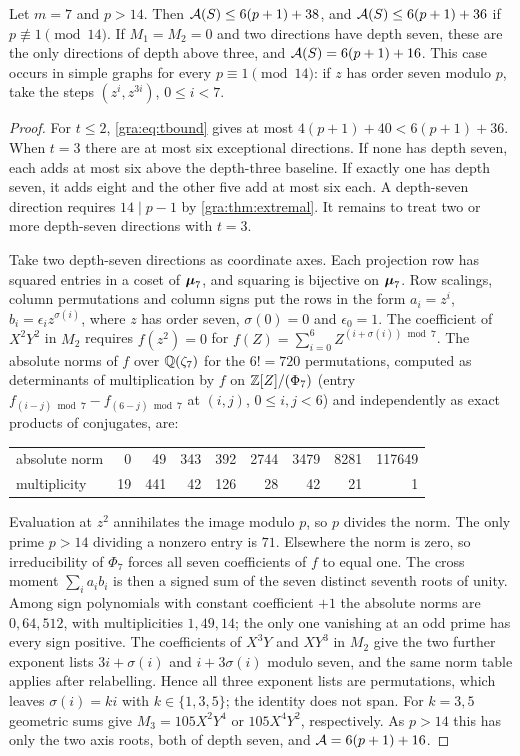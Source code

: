 \begin{theorem}\label{gra:thm:seven}
Let $m=7$ and $p>14$. Then $\mathcal{A}(S)\le6(p+1)+38$, and
$\mathcal{A}(S)\le6(p+1)+36$ if $p\not\equiv1\pmod{14}$. If $M_1=M_2=0$ and two
directions have depth seven, these are the only directions of depth above
three, and $\mathcal{A}(S)=6(p+1)+16$. This case occurs in simple graphs for
every $p\equiv1\pmod{14}$: if $z$ has order seven modulo $p$, take the
steps $(z^i,z^{3i})$, $0\le i<7$.
\end{theorem}

\begin{proof}
For $t\le2$, \eqref{gra:eq:tbound} gives at most
$4(p+1)+40<6(p+1)+36$. When $t=3$ there are at most six exceptional
directions. If none has depth seven, each adds at most six above the
depth-three baseline. If exactly one has depth seven, it adds eight and
the other five add at most six each. A depth-seven direction requires
$14\mid p-1$ by \cref{gra:thm:extremal}. It remains to treat two or more
depth-seven directions with $t=3$.

Take two depth-seven directions as coordinate axes. Each projection row
has squared entries in a coset of $\boldsymbol{\mu}_7$, and squaring is bijective on
$\boldsymbol{\mu}_7$. Row scalings, column permutations and column signs put the
rows in the form $a_i=z^i$, $b_i=\epsilon_iz^{\sigma(i)}$, where $z$ has
order seven, $\sigma(0)=0$ and $\epsilon_0=1$. The coefficient of
$X^2Y^2$ in $M_2$ requires $f(z^2)=0$ for
$f(Z)=\sum_{i=0}^6Z^{(i+\sigma(i))\bmod7}$. The absolute norms of $f$ over
$\mathbb{Q}(\zeta_7)$ for the $6!=720$ permutations, computed as determinants of
multiplication by $f$ on $\mathbb{Z}[Z]/(\Phi_7)$ (entry
$f_{(i-j)\bmod7}-f_{(6-j)\bmod7}$ at $(i,j)$, $0\le i,j<6$) and
independently as exact products of conjugates, are:
\begin{center}\small\upshape
\begin{tabular}{lrrrrrrrr}
\toprule
absolute norm & 0 & 49 & 343 & 392 & 2744 & 3479 & 8281 & 117649\\
multiplicity & 19 & 441 & 42 & 126 & 28 & 42 & 21 & 1\\
\bottomrule
\end{tabular}
\end{center}
Evaluation at $z^2$ annihilates the image modulo $p$, so $p$ divides the
norm. The only prime $p>14$ dividing a nonzero entry is $71$. Elsewhere
the norm is zero, so irreducibility of $\Phi_7$ forces all seven
coefficients of $f$ to equal one. The cross moment $\sum_ia_ib_i$ is then a
signed sum of the seven distinct seventh roots of unity. Among sign
polynomials with constant coefficient $+1$ the absolute norms are
$0,64,512$, with multiplicities $1,49,14$; the only one vanishing at an
odd prime has every sign positive. The coefficients of $X^3Y$ and $XY^3$
in $M_2$ give the two further exponent lists $3i+\sigma(i)$ and
$i+3\sigma(i)$ modulo seven, and the same norm table applies after
relabelling. Hence all three exponent lists are permutations, which leaves
$\sigma(i)=ki$ with $k\in\{1,3,5\}$; the identity does not span. For
$k=3,5$ geometric sums give $M_3=105X^2Y^4$ or $105X^4Y^2$, respectively.
As $p>14$ this has only the two axis roots, both of depth seven, and
$\mathcal{A}=6(p+1)+16$.


\end{proof}
